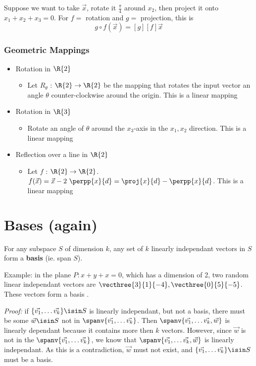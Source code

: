 \documentclass[12pt]{article}
\begin{document}
Suppose we want to take $\vec{x}$, rotate it $\frac{\pi}{4}$ around $x_2$, then project it onto $x_1 + x_2 + x_3 = 0$. For $f=$ rotation and $g=$ projection, this is \[ g\circ f(\vec{x}) = [g][f]\vec{x} \]

\subsubsection*{Geometric Mappings}
\begin{itemize}
\item{Rotation in $\R{2}$}
\begin{itemize}
\item{Let $R_\theta$ : $\R{2} \to \R{2}$ be the mapping that rotates the input vector an angle $\theta$ counter-clockwise around the origin. This is a linear mapping}
\end{itemize}
\item{Rotation in $\R{3}$}
\begin{itemize}
\item{Rotate an angle of $\theta$ around the $x_3$-axis in the $x_1,x_2$ direction. This is a linear mapping}
\end{itemize}
\item{Reflection over a line in $\R{2}$}
\begin{itemize}
\item{Let $f$ : $\R{2} \to \R{2}$. $f(\vec{x}) = \vec{x} - 2\ \perpp{x}{d} = \proj{x}{d} - \perpp{x}{d}$. This is a linear mapping}
\end{itemize}
\end{itemize}

\section*{Bases (again)}
For any subspace $S$ of dimension $k$, any set of $k$ linearly independant vectors in $S$ form a {\bf basis} (ie. span $S$).

Example: in the plane $P: x + y + x = 0$, which has a dimension of 2, two random linear independant vectors are $\vecthree{3}{1}{-4},\vecthree{0}{5}{-5}$. These vectors form a basis .

\textit{Proof:} if $\{\vec{v_1},\dots \vec{v_k}\}\isin S$ is linearly independant, but not a basis, there must be some $\vec{w}\isin S$ not in $\spanv{\vec{v_1},\dots \vec{v_k}}$. Then $\spanv{\vec{v_1},\dots \vec{v_k}, \vec{w}}$ is linearly dependant because it contains more then $k$ vectors. However, since $\vec{w}$ is not in the $\spanv{\vec{v_1},\dots \vec{v_k}}$, we know that $\spanv{\vec{v_1},\dots \vec{v_k}, \vec{w}}$ is linearly independant. As this is a contradiction, $\vec{w}$ must not exist, and $\{\vec{v_1},\dots \vec{v_k}\}\isin S$ must be a basis.
\end{document}
